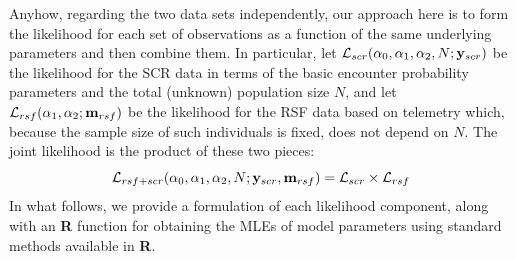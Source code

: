 Anyhow, regarding the two data sets independently, our approach here
is to form the likelihood for each set of observations as a function
of the same underlying parameters and then combine them. In
particular, let ${\cal L}_{scr}(\alpha_{0}, \alpha_{1}, \alpha_{2}, N;
{\bf y}_{scr})$
be the likelihood for the SCR data in terms of the basic encounter
probability parameters and the total (unknown) population size $N$,
and let ${\cal L}_{rsf}(\alpha_{1},\alpha_{2}; {\bf m}_{rsf})$ be the
likelihood for the RSF data based on telemetry which, because the
sample size of such individuals is fixed, does not depend on $N$.
The
joint likelihood is the product of these two pieces:
\[
{\cal L}_{rsf+scr}(\alpha_{0},\alpha_{1},\alpha_{2},N; {\bf y}_{scr},{\bf
  m}_{rsf})  = {\cal L}_{scr} \times {\cal L}_{rsf}
\]
In what follows, we provide a formulation of each likelihood
component, along with an {\bf R} function for obtaining the MLEs of
model parameters using standard methods available in {\bf R}.

